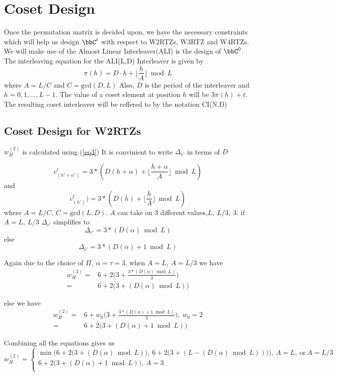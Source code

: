 \section{Coset Design}
Once the permutation matrix is decided upon, we have the necessary constraints which will help us design $\bbC^t$ with respect to W2RTZs, W3RTZ and W4RTZs.
We will make use of the Almost Linear Interleaver(ALI) is the design of $\bbC^0$. 
The interleaving equation for the ALI(L,D) Interleaver is given by $$\pi(h)=D \cdot h + \Big\lfloor \frac{h}{A} \Big\rfloor \bmod L$$ where $A=L/C$ and $C=\text{gcd}(D,L)$ Also, $D$ is the period of the interleaver and $h=0,1,...,L-1$.
The value of a coset element at position $h$ will be $3\pi(h)+t$. The resulting coset interleaver will be reffered to by the notation CI(N,D)

\subsection{Coset Design for W2RTZs}
$w_H^{(2)}$ is calculated using (\ref{eq3})
 It is convinient to write $\Delta_{c'}$ in terms of $D$ 

$$c_{(h'+\alpha')}^{t}=3*(D(h+\alpha)+ \lfloor \frac{h+\alpha}{A} \rfloor \bmod L)$$ and $$c_{(h')}^{t})=3*(D(h)+ \lfloor \frac{h}{A} \rfloor \bmod L)$$
where $A=L/C,~C=\text{gcd}(L,D)$. 
$A$ can take on $3$ different values,$L,~L/3,~3$.
if $A=L,~L/3$ $\Delta_{c'}$ simplifies to $$\Delta_{c'}=3*(D(\alpha) \bmod L)$$ else $$\Delta_{c'}=3*(D(\alpha) +1\bmod L)$$ 

Again due to the choice of $\Pi,~\alpha=\tau=3$, when $A=L,~A=L/3$ we have 
\begin{equation*}
\begin{split}
w^{(2)}_H=&6+2\Big(3+\frac{3*(D(\alpha) \bmod L)}{3}\Big)\\
=&6+2\Big(3+(D(\alpha) \bmod L)\Big)
\end{split}
\end{equation*}

else we have 
\begin{equation*}
\begin{split}
w^{(2)}_H=&6+w_0\Big(3+\frac{3*(D(\alpha) +1 \bmod L)}{3}\Big),~w_0=2\\
=&6+2\Big(3+(D(\alpha)+1 \bmod L)\Big)
\end{split}
\end{equation*}

Combining all the equations gives us 
\begin{equation}
w^{(2)}_H=
\begin{cases}
\min \Bigg (6+2\Big(3+(D(\alpha) \bmod L)\Big),~6+2\Big(3+(L-(D(\alpha) \bmod L))\Big)\Bigg), ~A=L,~\text{or}~A=L/3 \\
6+2\Big(3+(D(\alpha)+1 \bmod L)\Big), ~A=3\\

\end{cases}
\label{eq9}
\end{equation}

